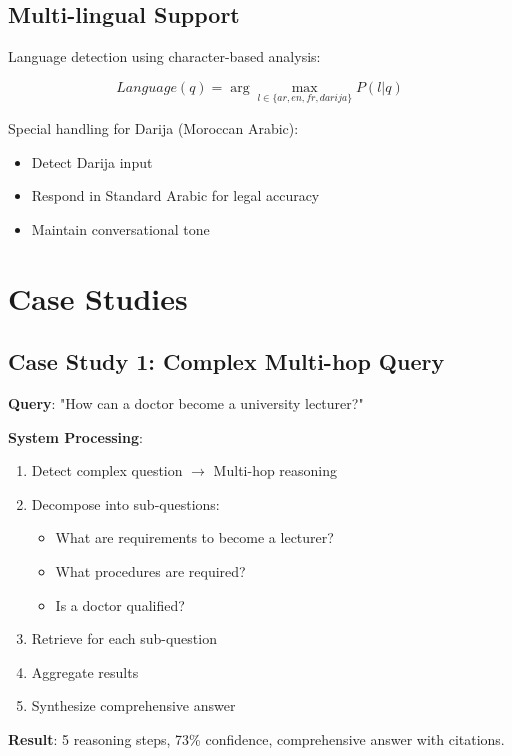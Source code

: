 \documentclass[12pt,a4paper]{article}
\begin{document}
\subsection{Multi-lingual Support}

Language detection using character-based analysis:

\begin{equation}
Language(q) = \arg\max_{l \in \{ar, en, fr, darija\}} P(l|q)
\end{equation}

Special handling for Darija (Moroccan Arabic):
\begin{itemize}
    \item Detect Darija input
    \item Respond in Standard Arabic for legal accuracy
    \item Maintain conversational tone
\end{itemize}


\section{Case Studies}

\subsection{Case Study 1: Complex Multi-hop Query}

\textbf{Query}: "How can a doctor become a university lecturer?"

\textbf{System Processing}:
\begin{enumerate}
    \item Detect complex question $\rightarrow$ Multi-hop reasoning
    \item Decompose into sub-questions:
    \begin{itemize}
        \item What are requirements to become a lecturer?
        \item What procedures are required?
        \item Is a doctor qualified?
    \end{itemize}
    \item Retrieve for each sub-question
    \item Aggregate results
    \item Synthesize comprehensive answer
\end{enumerate}

\textbf{Result}: 5 reasoning steps, 73\% confidence, comprehensive answer with citations.
\end{document}
